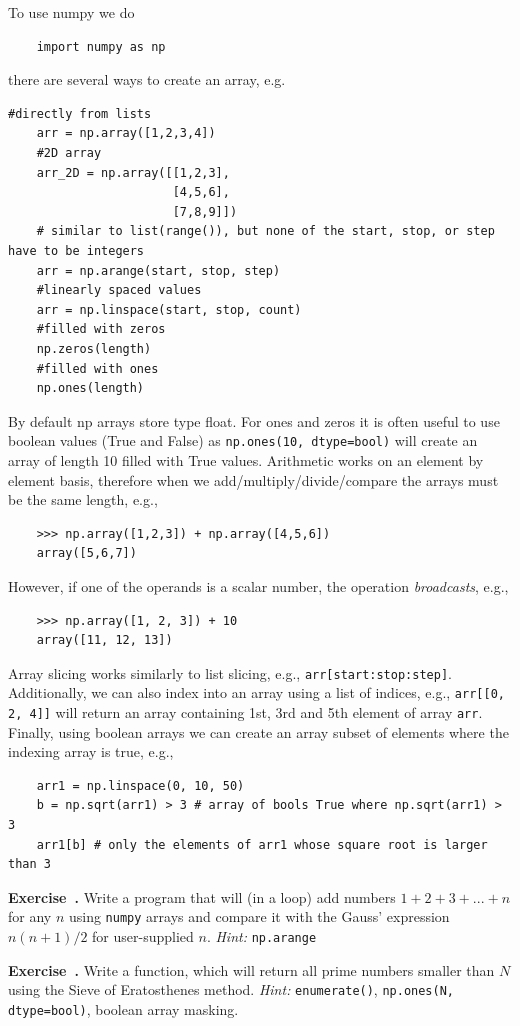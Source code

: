 \documentclass{article}
\newcounter{exercise}
\newenvironment{exercise}[1][]%
    {\refstepcounter{exercise}%
    \begin{mdframed}[backgroundcolor=exercise,linecolor=white]%
    \textbf{Exercise~\theexercise.} #1 \rmfamily}%
    {\medskip\end{mdframed}}
\begin{document}
To use numpy we do
\begin{lstlisting}
    import numpy as np
\end{lstlisting}
there are several ways to create an array, e.g.
\begin{lstlisting}[caption=Array creation.]
    #directly from lists
    arr = np.array([1,2,3,4])
    #2D array
    arr_2D = np.array([[1,2,3],
                       [4,5,6],
                       [7,8,9]])
    # similar to list(range()), but none of the start, stop, or step have to be integers
    arr = np.arange(start, stop, step)
    #linearly spaced values
    arr = np.linspace(start, stop, count)
    #filled with zeros
    np.zeros(length)
    #filled with ones
    np.ones(length)
\end{lstlisting}

By default np arrays store type float. For ones and zeros it is often useful to use boolean values (True and False) as \lstinline{np.ones(10, dtype=bool)} will create an array of length 10 filled with True values. Arithmetic works on an element by element basis, therefore when we add/multiply/divide/compare the arrays must be the same length, e.g.,
\begin{lstlisting}
    >>> np.array([1,2,3]) + np.array([4,5,6])
    array([5,6,7])
\end{lstlisting}
However, if one of the operands is a scalar number, the operation \emph{broadcasts}, e.g.,
\begin{lstlisting}
    >>> np.array([1, 2, 3]) + 10
    array([11, 12, 13])
\end{lstlisting}

Array slicing works similarly to list slicing, e.g., \lstinline{arr[start:stop:step]}. Additionally, we can also index into an array using a list of indices, e.g., \lstinline{arr[[0, 2, 4]]} will return an array containing 1st, 3rd and 5th element of array \lstinline{arr}. Finally, using boolean arrays we can create an array subset of elements where the indexing array is true, e.g.,
\begin{lstlisting}
    arr1 = np.linspace(0, 10, 50)
    b = np.sqrt(arr1) > 3 # array of bools True where np.sqrt(arr1) > 3
    arr1[b] # only the elements of arr1 whose square root is larger than 3
\end{lstlisting}

\begin{exercise}
    Write a program that will (in a loop) add numbers $1 + 2 + 3 + ... + n$ for any $n$ using \verb|numpy| arrays and compare it with the Gauss' expression $n(n+1)/2$ for user-supplied $n$. \emph{Hint:} \verb|np.arange|
\end{exercise}
\begin{exercise}
    Write a function, which will return all prime numbers smaller than $N$ using the Sieve of Eratosthenes method. \emph{Hint:} \verb|enumerate()|, \verb|np.ones(N, dtype=bool)|, boolean array masking.
\end{exercise}
\end{document}

